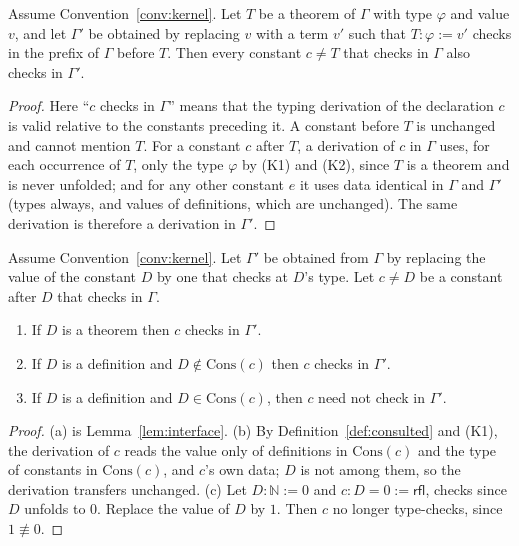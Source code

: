 \begin{lemma}
\label{lem:interface}
Assume Convention~\ref{conv:kernel}. Let $T$ be a theorem of $\Gamma$ with type $\varphi$ and value $v$, and let $\Gamma'$ be obtained by replacing $v$ with a term $v'$ such that $T:\varphi:=v'$ checks in the prefix of $\Gamma$ before $T$. Then every constant $c\ne T$ that checks in $\Gamma$ also checks in $\Gamma'$.
\end{lemma}

\begin{proof}
Here ``$c$ checks in $\Gamma$'' means that the typing derivation of the declaration $c$ is valid relative to the constants preceding it. A constant before $T$ is unchanged and cannot mention $T$. For a constant $c$ after $T$, a derivation of $c$ in $\Gamma$ uses, for each occurrence of $T$, only the type $\varphi$ by (K1) and (K2), since $T$ is a theorem and is never unfolded; and for any other constant $e$ it uses data identical in $\Gamma$ and $\Gamma'$ (types always, and values of definitions, which are unchanged). The same derivation is therefore a derivation in $\Gamma'$.
\end{proof}

\begin{theorem}
\label{thm:blast}
Assume Convention~\ref{conv:kernel}. Let $\Gamma'$ be obtained from $\Gamma$ by replacing the value of the constant $D$ by one that checks at $D$'s type. Let $c\ne D$ be a constant after $D$ that checks in $\Gamma$.
\begin{enumerate}[label=(\alph*),nosep]
\item If $D$ is a theorem then $c$ checks in $\Gamma'$.
\item If $D$ is a definition and $D\notin\mathrm{Cons}(c)$ then $c$ checks in $\Gamma'$.
\item If $D$ is a definition and $D\in\mathrm{Cons}(c)$, then $c$ need not check in $\Gamma'$.
\end{enumerate}
\end{theorem}

\begin{proof}
(a) is Lemma~\ref{lem:interface}. (b) By Definition~\ref{def:consulted} and (K1), the derivation of $c$ reads the value only of definitions in $\mathrm{Cons}(c)$ and the type of constants in $\mathrm{Cons}(c)$, and $c$'s own data; $D$ is not among them, so the derivation transfers unchanged. (c) Let $D:\mathbb{N}:=0$ and $c:D=0:=\mathsf{rfl}$, checks since $D$ unfolds to $0$. Replace the value of $D$ by $1$. Then $c$ no longer type-checks, since $1\not\equiv0$.
\end{proof}

